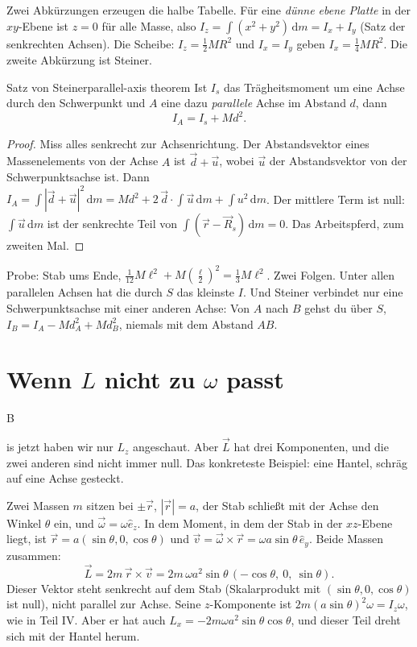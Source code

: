 \documentclass[deutsch]{kaelearn}
\newcommand\dd{\mathrm{d}}
\begin{document}
Zwei Abkürzungen erzeugen die halbe Tabelle. Für eine \emph{dünne ebene Platte} in der $xy$-Ebene ist $z = 0$ für alle Masse, also
$I_z = \int(x^2+y^2)\,\dd m = I_x+I_y$ (Satz der senkrechten Achsen). Die Scheibe: $I_z = \frac12MR^2$ und $I_x = I_y$ geben
$I_x = \frac14MR^2$. Die zweite Abkürzung ist Steiner.

\begin{theorem}{Satz von Steiner}{parallel-axis theorem}
Ist $I_s$ das Trägheitsmoment um eine Achse durch den Schwerpunkt und $A$ eine dazu \emph{parallele} Achse im Abstand $d$, dann
\[
  I_A = I_s + Md^2 .
\]
\end{theorem}
\begin{proof}
Miss alles senkrecht zur Achsenrichtung. Der Abstandsvektor eines Massenelements von der Achse $A$ ist $\vec d + \vec u$, wobei $\vec u$ der
Abstandsvektor von der Schwerpunktsachse ist. Dann
$I_A = \int|\vec d+\vec u|^2\,\dd m = Md^2 + 2\,\vec d\cdot\!\int\vec u\,\dd m + \int u^2\,\dd m$.
Der mittlere Term ist null: $\int\vec u\,\dd m$ ist der senkrechte Teil von $\int(\vec r-\vec R_s)\,\dd m = 0$. Das Arbeitspferd, zum
zweiten Mal.
\end{proof}

Probe: Stab ums Ende, $\frac1{12}M\ell^2 + M(\frac\ell2)^2 = \frac13M\ell^2$. Zwei Folgen. Unter allen parallelen Achsen hat die durch $S$
das kleinste $I$. Und Steiner verbindet nur eine Schwerpunktsachse mit einer anderen Achse: Von $A$ nach $B$ gehst du über $S$,
$I_B = I_A - Md_A^2 + Md_B^2$, niemals mit dem Abstand $AB$.

\section{Wenn \texorpdfstring{$L$}{L} nicht zu \texorpdfstring{$\omega$}{omega} passt}

\opening{B}{is jetzt} haben wir nur $L_z$ angeschaut. Aber $\vec L$ hat drei Komponenten, und die zwei anderen sind nicht immer null.
Das konkreteste Beispiel: eine Hantel, schräg auf eine Achse gesteckt.

Zwei Massen $m$ sitzen bei $\pm\vec r$, $|\vec r| = a$, der Stab schließt mit der Achse den Winkel $\theta$ ein, und $\vec\omega = \omega\hat e_z$.
In dem Moment, in dem der Stab in der $xz$-Ebene liegt, ist $\vec r = a(\sin\theta,0,\cos\theta)$ und $\vec v = \vec\omega\times\vec r = \omega a\sin\theta\,\hat e_y$.
Beide Massen zusammen:
\[
  \vec L = 2m\,\vec r\times\vec v = 2m\,\omega a^2\sin\theta\,(-\cos\theta,\ 0,\ \sin\theta).
\]
Dieser Vektor steht senkrecht auf dem Stab (Skalarprodukt mit $(\sin\theta,0,\cos\theta)$ ist null), nicht parallel zur Achse. Seine
$z$-Komponente ist $2m(a\sin\theta)^2\omega = I_z\omega$, wie in Teil IV. Aber er hat auch $L_x = -2m\omega a^2\sin\theta\cos\theta$, und
dieser Teil dreht sich mit der Hantel herum.
\end{document}
